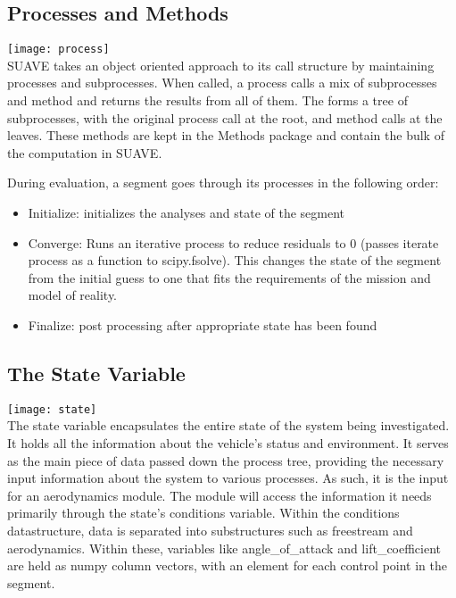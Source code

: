 \documentclass[11pt, oneside]{article}   	%
\begin{document}
\subsection{Processes and Methods}
\texttt{[image: process]}\\
SUAVE takes an object oriented approach to its call structure by maintaining processes and subprocesses.  When called, a process calls a mix of subprocesses and method and returns the results from all of them.  The forms a tree of subprocesses, with the original process call at the root, and method calls at the leaves.  These methods are kept in the Methods package and contain the bulk of the computation in SUAVE.\par
During evaluation, a segment goes through its processes in the following order:
\begin{itemize}
\item Initialize: initializes the analyses and state of the segment
\item Converge: Runs an iterative process to reduce residuals to 0 (passes iterate process as a function to scipy.fsolve).  This changes the state of the segment from the initial guess to one that fits the requirements of the mission and model of reality.
\item Finalize: post processing after appropriate state has been found
\end{itemize}
\subsection{The State Variable}
\texttt{[image: state]}\\
The state variable encapsulates the entire state of the system being investigated.  It holds all the information about the vehicle's status and environment.  It serves as the main piece of data passed down the process tree, providing the necessary input information about the system to various processes.  As such, it is the input for an aerodynamics module.  The module will access the information it needs primarily through the state's conditions variable.  Within the conditions datastructure, data is separated into substructures such as freestream and aerodynamics.  Within these, variables like angle\_of\_attack and lift\_coefficient are held as numpy column vectors, with an element for each control point in the segment.\par
\end{document}
